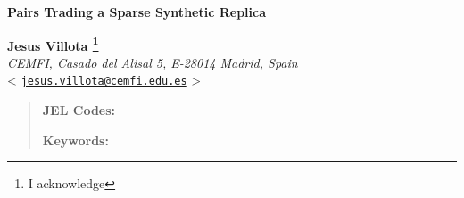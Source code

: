 \documentclass[12pt,a4paper]{article}
\begin{document}
\begin{center}
{\Large \textbf{
Pairs Trading a Sparse Synthetic Replica
}}

\vspace{3cm}

{\large \textbf{Jesus Villota
\footnote{I acknowledge}
}}\\
\textit{CEMFI, Casado del Alisal 5, E-28014 Madrid, Spain}\\
<
\href{mailto:jesus.villota@cemfi.edu.es}{\texttt{jesus.villota@cemfi.edu.es}}
>

\vspace{2cm}


\end{center}

\thispagestyle{empty}

\begin{abstract}
%
\noindent\textbf{JEL Codes:} 

\noindent\textbf{Keywords:} 
\end{abstract}

\newpage
\setcounter{page}{1}




%

%

%

%





%
\end{document}
